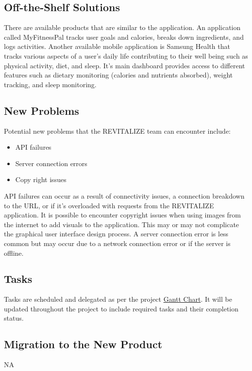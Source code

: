\documentclass[12pt,letterpaper]{article}
\begin{document}
\subsection{Off-the-Shelf Solutions}
There are available products that are similar to the application. An application called MyFitnessPal tracks user goals and calories, breaks down ingredients, and logs activities. Another available mobile application is Samsung Health that tracks various aspects of a user's daily life contributing to their well being such as physical activity, diet, and sleep. It's main dashboard provides access to different features such as dietary monitoring (calories and nutrients absorbed), weight tracking, and sleep monitoring. 

\subsection{New Problems}
Potential new problems that the REVITALIZE team can encounter include:
\begin{itemize}
\item API failures
\item Server connection errors
\item Copy right issues
\end{itemize}
API failures can occur as a result of connectivity issues, a connection breakdown to the URL, or if it's overloaded with requests from the REVITALIZE application. It is possible to encounter copyright issues when using images from the internet to add visuals to the application. This may or may not complicate the graphical user interface design process. A server connection error is less common but may occur due to a network connection error or if the server is offline.

\subsection{Tasks}
Tasks are scheduled and delegated as per the project \href{https://github.com/BillNguyen1999/REVITALIZE/blob/main/projectschedule/REVITALIZE.pdf}{\color{blue}Gantt Chart}. It will be updated throughout the project to include required tasks and their completion status.

\subsection{Migration to the New Product}
NA
\end{document}
